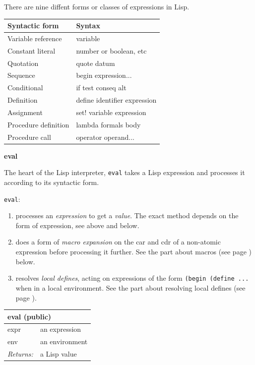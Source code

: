 \documentclass[twoside,9pt]{report}
\begin{document}
There are nine diffent forms or classes of expressions in Lisp.

\begin{tabular}{|l l|}
\hline
Syntactic form & Syntax \\
\hline
Variable reference & variable \\
Constant literal & number or boolean, etc \\
Quotation & quote datum \\
Sequence & begin expression... \\
Conditional & if test conseq alt \\
Definition & define identifier expression \\
Assignment & set! variable expression \\
Procedure definition & lambda formals body \\
Procedure call & operator operand... \\
\hline
\end{tabular}


\textbf{eval}


The heart of the Lisp interpreter, \texttt{eval} takes a Lisp expression and processes it according to its syntactic form.


\texttt{eval}:

\begin{enumerate}
\item  processes an \emph{expression} to get a \emph{value}. The exact method depends on the form of expression, see above and below.
\item  does a form of \emph{macro expansion} on the car and cdr of a non-atomic expression before processing it further. See the part about macros (see page \pageref{macros}) below.
\item  resolves \emph{local defines}, acting on expressions of the form \texttt{(begin (define ...} when in a local environment. See the part about resolving local defines (see page \pageref{resolving-local-defines}).
\end{enumerate}
\begin{tabular}{ |l l| }
\hline
\multicolumn{2}{|l|}{eval (public)} \\
\hline
expr & an expression \\
env & an environment \\
\textit{Returns:} & a Lisp value \\
\hline
\end{tabular}
\end{document}
